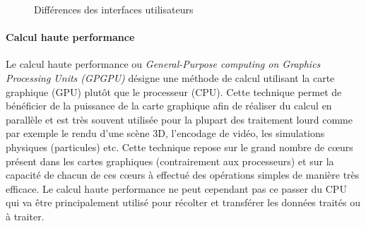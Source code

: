 \begin{figure}[H]
    \centering
\caption{Différences des interfaces utilisateurs}
\label{fig:GUITUI}
\end{figure}

\paragraph{Calcul haute performance}
Le calcul haute performance ou \emph{General-Purpose computing on Graphics Processing Units (GPGPU)} désigne une méthode de calcul utilisant la carte graphique (GPU) plutôt que le processeur (CPU). Cette technique permet de bénéficier de la puissance de la carte graphique afin de réaliser du calcul en parallèle et est très souvent utilisée pour la plupart des traitement lourd comme par exemple le rendu d'une scène 3D, l'encodage de vidéo, les simulations physiques (particules) etc. Cette technique repose sur le grand nombre de cœurs présent dans les cartes graphiques (contrairement aux processeurs) et sur la capacité de chacun de ces cœurs à effectué des opérations simples de manière très efficace. Le calcul haute performance ne peut cependant pas ce passer du CPU qui va être principalement utilisé pour récolter et transférer les données traités ou à traiter.

